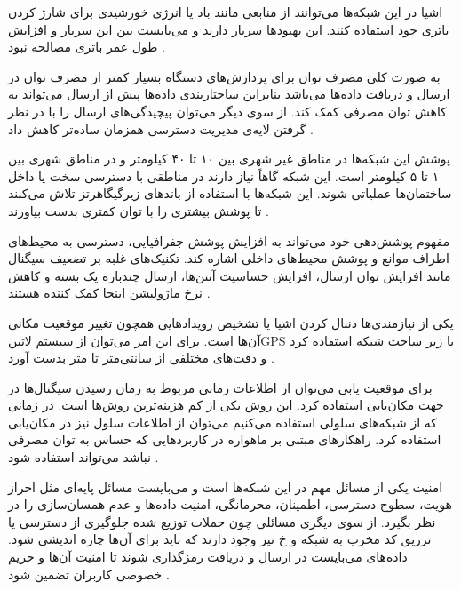 اشیا در این شبکه‌ها می‌توانند از منابعی مانند باد یا انرژی خورشیدی برای شارژ کردن باتری خود استفاده کنند.
این بهبودها سربار دارند و می‌بایست بین این سربار و افزایش طول عمر باتری مصالحه نبود
.

به صورت کلی مصرف توان برای پردازش‌های دستگاه بسیار کمتر از مصرف توان در ارسال و دریافت داده‌ها می‌باشد
بنابراین ساختاربندی داده‌ها پیش از ارسال می‌تواند به کاهش توان مصرفی کمک کند. از سوی دیگر می‌توان پیچیدگی‌های
ارسال را با در نظر گرفتن لایه‌ی مدیریت دسترسی همزمان ساده‌تر کاهش داد
.


پوشش این شبکه‌ها در مناطق غیر شهری بین ۱۰ تا ۴۰ کیلومتر و
در مناطق شهری بین ۱ تا ۵ کیلومتر است.
این شبکه گاهاً نیاز دارند در مناطقی با دسترسی سخت یا داخل ساختمان‌ها
عملیاتی شوند. این شبکه‌ها با استفاده از باندهای زیرگیگاهرتز تلاش می‌کنند تا پوشش بیشتری را با توان کمتری بدست بیاورند
.

مفهوم پوشش‌دهی خود می‌تواند به افزایش پوشش جفرافیایی، دسترسی به محیط‌های اطراف موانع و پوشش محیط‌های داخلی اشاره کند.
تکنیک‌های غلبه بر تضعیف سیگنال مانند افزایش توان ارسال، افزایش حساسیت آنتن‌ها، ارسال چندباره یک بسته و کاهش نرخ ماژولیشن اینجا کمک کننده هستند
.


یکی از نیازمندی‌ها دنبال کردن اشیا یا تشخیص رویدادهایی همچون تغییر موقعیت مکانی آن‌ها است.
برای این امر می‌توان از سیستم ‌لاتین{GPS} یا زیر ساخت شبکه استفاده کرد و دقت‌های مختلفی
از سانتی‌متر تا متر بدست آورد
.

برای موقعیت یابی می‌توان از اطلاعات زمانی مربوط به زمان رسیدن سیگنال‌ها در جهت مکان‌یابی استفاده کرد. این روش
یکی از کم هزینه‌ترین روش‌ها است. در زمانی که از شبکه‌های سلولی استفاده می‌کنیم می‌توان از اطلاعات سلول نیز
در مکان‌یابی استفاده کرد. راهکارهای مبتنی بر ماهواره در کاربردهایی که حساس به توان مصرفی نباشد می‌تواند استفاده شود
.


امنیت یکی از مسائل مهم در این شبکه‌ها است و می‌بایست مسائل پایه‌ای
مثل احراز هویت، سطوح دسترسی، اطمینان، محرمانگی، امنیت داده‌ها و عدم همسان‌سازی را در نظر بگیرد.
از سوی دیگری مسائلی چون حملات توزیع شده جلوگیری از دسترسی یا تزریق کد مخرب به شبکه و ‌خ
نیز وجود دارند که باید برای آن‌ها چاره اندیشی شود.
داده‌های می‌بایست در ارسال و دریافت رمزگذاری شوند تا امنیت آن‌ها و حریم خصوصی کاربران تضمین شود
.

